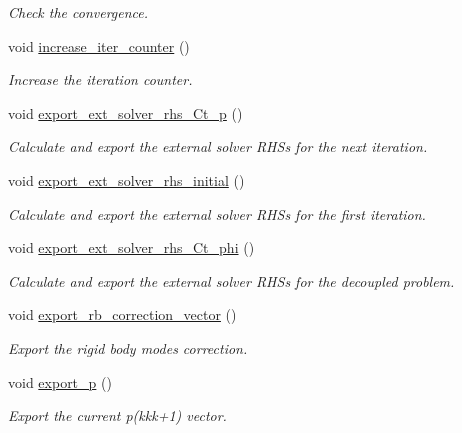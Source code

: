 \begin{DoxyCompactItemize}
\begin{DoxyCompactList}\small\item\em Check the convergence. \end{DoxyCompactList}\item 
void \hyperlink{classcarl_1_1_f_e_t_i___operations_ae6eda0f87c0db66e7f68909579ecf70e}{increase\+\_\+iter\+\_\+counter} ()
\begin{DoxyCompactList}\small\item\em Increase the iteration counter. \end{DoxyCompactList}\item 
void \hyperlink{classcarl_1_1_f_e_t_i___operations_aeae75ac377f315f1fd61883143f8679a}{export\+\_\+ext\+\_\+solver\+\_\+rhs\+\_\+\+Ct\+\_\+p} ()
\begin{DoxyCompactList}\small\item\em Calculate and export the external solver R\+H\+S\textquotesingle{}s for the next iteration. \end{DoxyCompactList}\item 
void \hyperlink{classcarl_1_1_f_e_t_i___operations_aaf32fdf315e2c7d5b805b67baed49bf2}{export\+\_\+ext\+\_\+solver\+\_\+rhs\+\_\+initial} ()
\begin{DoxyCompactList}\small\item\em Calculate and export the external solver R\+H\+S\textquotesingle{}s for the first iteration. \end{DoxyCompactList}\item 
void \hyperlink{classcarl_1_1_f_e_t_i___operations_af22185015710a521bbdfe7fa8ca41ad5}{export\+\_\+ext\+\_\+solver\+\_\+rhs\+\_\+\+Ct\+\_\+phi} ()
\begin{DoxyCompactList}\small\item\em Calculate and export the external solver R\+H\+S\textquotesingle{}s for the decoupled problem. \end{DoxyCompactList}\item 
void \hyperlink{classcarl_1_1_f_e_t_i___operations_a247d814911ded3cbef15c3c08116afe5}{export\+\_\+rb\+\_\+correction\+\_\+vector} ()
\begin{DoxyCompactList}\small\item\em Export the rigid body modes correction. \end{DoxyCompactList}\item 
void \hyperlink{classcarl_1_1_f_e_t_i___operations_a7da32a6ef6337cb2f3571beac21e0372}{export\+\_\+p} ()
\begin{DoxyCompactList}\small\item\em Export the current {\ttfamily p(kkk+1)} vector. \end{DoxyCompactList}\item 

\end{DoxyCompactItemize}
